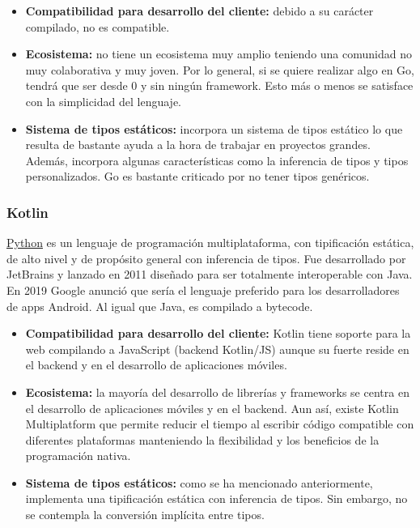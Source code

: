 \begin{itemize}
    \item[\mal] \textbf{Compatibilidad para desarrollo del cliente:} debido a su carácter compilado, no es compatible.
    \item[\regular] \textbf{Ecosistema:} no tiene un ecosistema muy amplio teniendo una comunidad no muy colaborativa y muy joven. Por lo general, si se quiere realizar algo en Go, tendrá que ser desde 0 y sin ningún framework. Esto más o menos se satisface con la simplicidad del lenguaje.
    \item[\bien] \textbf{Sistema de tipos estáticos:} incorpora un sistema de tipos estático lo que resulta de bastante ayuda a la hora de trabajar en proyectos grandes. Además, incorpora algunas características como la inferencia de tipos y tipos personalizados. Go es bastante criticado por no tener tipos genéricos.
\end{itemize}

\subsubsection{Kotlin}

\href{https://es.wikipedia.org/w/index.php?title=Kotlin_(lenguaje_de_programaci%C3%B3n)&oldid=160779037}{Python} es un lenguaje de programación multiplataforma, con tipificación estática, de alto nivel y de propósito general con inferencia de tipos. Fue desarrollado por JetBrains y lanzado en 2011 diseñado para ser totalmente interoperable con Java. En 2019 Google anunció que sería el lenguaje preferido para los desarrolladores de apps Android. Al igual que Java, es compilado a bytecode.

\begin{itemize}
    \item[\mal] \textbf{Compatibilidad para desarrollo del cliente:} Kotlin tiene soporte para la web compilando a JavaScript (backend Kotlin/JS) aunque su fuerte reside en el backend y en el desarrollo de aplicaciones móviles.
    \item[\regular] \textbf{Ecosistema:} la mayoría del desarrollo de librerías y frameworks se centra en el desarrollo de aplicaciones móviles y en el backend. Aun así, existe Kotlin Multiplatform que permite reducir el tiempo al escribir código compatible con diferentes plataformas manteniendo la flexibilidad y los beneficios de la programación nativa.
    \item[\bien] \textbf{Sistema de tipos estáticos:} como se ha mencionado anteriormente, implementa una tipificación estática con inferencia de tipos. Sin embargo, no se contempla la conversión implícita entre tipos.
\end{itemize}

